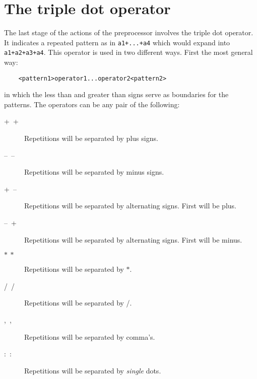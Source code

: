 \section{The triple dot operator}
\label{tripledot}

The last stage of the actions of the preprocessor involves the 
triple dot operator. It indicates a repeated pattern as in \verb:a1+...+a4: 
which would expand into \verb:a1+a2+a3+a4:. This operator is used in two 
different ways. First the most general way:
\begin{verbatim}
    <pattern1>operator1...operator2<pattern2>
\end{verbatim}
in which the less than and greater 
than signs serve as boundaries for the patterns. The operators can be any 
pair of the following:
\begin{description}
\item[+\ +] Repetitions will be separated by plus signs.
\item[--\ --] Repetitions will be separated by minus signs.
\item[+\ --] Repetitions will be separated by alternating signs. 
First will be plus.
\item[--\ +] Repetitions will be separated by alternating signs. 
First will be minus.
\item[$\ast\ \ast$] Repetitions will be separated by $\ast$.
\item[/\ /] Repetitions will be separated by /.
\item[,\ ,] Repetitions will be separated by comma's.
\item[:\ :] Repetitions will be separated by {\it single} dots.
\end{description}
